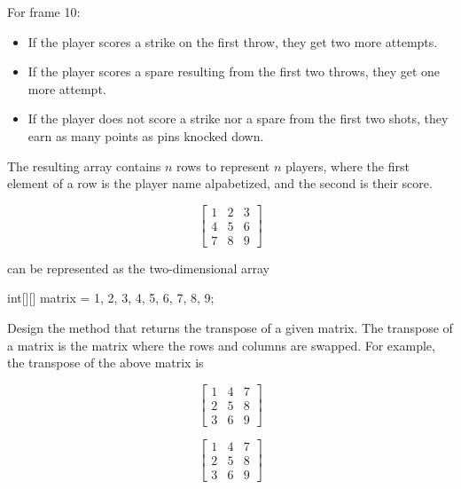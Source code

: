 For frame 10:
\begin{itemize}
    \item If the player scores a strike on the first throw, they get two more attempts.
    \item If the player scores a spare resulting from the first two throws, they get one more attempt.
    \item If the player does not score a strike nor a spare from the first two shots, they earn as many points as pins knocked down.
\end{itemize}

The resulting array contains $n$ rows to represent $n$ players, where the first element of a row is the player name alpabetized, and the second is their score.


\[
\begin{bmatrix}
    1 & 2 & 3\\
    4 & 5 & 6\\
    7 & 8 & 9
\end{bmatrix}
\]

\noindent can be represented as the two-dimensional array

\begin{verbnobox}[\small]
int[][] matrix = {{1, 2, 3}, {4, 5, 6}, {7, 8, 9}};
\end{verbnobox}

\noindent Design the  method that returns the transpose of a given matrix. The transpose of a matrix is the matrix where the rows and columns are swapped. For example, the transpose of the above matrix is

\[
\begin{bmatrix}
    1 & 4 & 7\\
    2 & 5 & 8\\
    3 & 6 & 9
\end{bmatrix}
\]


\[
\begin{bmatrix}
    1 & 4 & 7\\
    2 & 5 & 8\\
    3 & 6 & 9
\end{bmatrix}
\]

